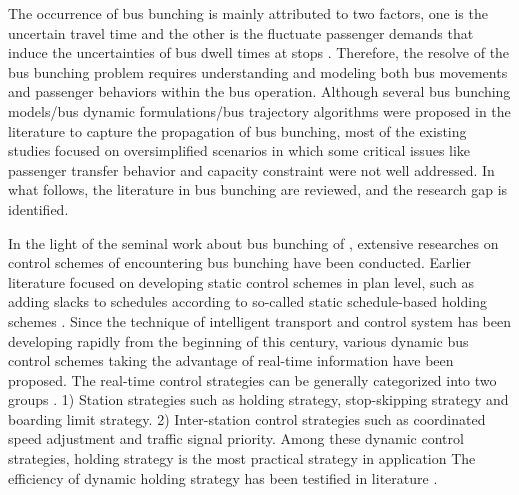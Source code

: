 \documentclass[smallextended]{svjour3}       %
\begin{document}
\begin{Abstract}
The occurrence of bus bunching is mainly attributed to two factors, one is the uncertain travel time and the other is the fluctuate passenger demands that induce the uncertainties of bus dwell times at stops \citep{2015Fonzone}. Therefore, the resolve of the bus bunching problem requires understanding and modeling both bus movements and passenger behaviors within the bus operation. Although several bus bunching models/bus dynamic formulations/bus trajectory algorithms were proposed in the literature to capture the propagation of bus bunching, most of the existing studies focused on oversimplified scenarios in which some critical issues like passenger transfer behavior and capacity constraint were not well addressed.
In what follows, the literature in bus bunching are reviewed, and the research gap is identified.

In the light of the seminal work about bus bunching of \cite{1964Nwell}, 
extensive researches on control schemes of encountering bus bunching have been conducted.
Earlier literature focused on developing static control schemes in plan level, 
such as adding slacks to schedules according to so-called static schedule-based holding schemes 
\citep{1989Abkowitz,2001Eberlein}.%
Since the technique of intelligent transport and control system has been developing rapidly from the beginning of this century, various dynamic bus control schemes taking the advantage of real-time information have been proposed.
The real-time control strategies can be generally categorized into two groups \citep{2015Ibarra-Rojas}.
1) Station strategies such as holding strategy, stop-skipping strategy and boarding limit strategy.
2) Inter-station control strategies such as coordinated speed adjustment and traffic signal priority.
Among these dynamic control strategies, holding strategy is the most practical strategy in application \citep{2013Cats,2001Eberlein}
The efficiency of dynamic holding strategy has been testified in literature
\citep{2009Daganzo,2011Xuan,2012ABartholdi,2015Argote-Cabanero}.


\end{Abstract}
\end{document}
